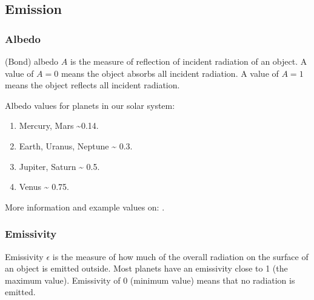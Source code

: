 \documentclass[letterpaper,10pt,english]{sphinxmanual}
\begin{document}
\subsection{Emission}
\label{\detokenize{quantities/surface/emission/emission:emission}}\label{\detokenize{quantities/surface/emission/emission::doc}}\label{\detokenize{quantities/surface/emission/emission:id1}}

\subsubsection{Albedo}
\label{\detokenize{quantities/surface/emission/albedo:albedo}}\label{\detokenize{quantities/surface/emission/albedo::doc}}\label{\detokenize{quantities/surface/emission/albedo:id1}}
\sphinxAtStartPar
(Bond) albedo \(A\) is the measure of reflection of incident radiation of an object.
A value of \(A = 0\) means the object absorbs all incident radiation.
A value of \(A = 1\) means the object reflects all incident radiation.

\sphinxAtStartPar
Albedo values for planets in our solar system:
\begin{enumerate}
%
\item {} 
\sphinxAtStartPar
Mercury, Mars \textasciitilde{}0.14.

\item {} 
\sphinxAtStartPar
Earth, Uranus, Neptune \textasciitilde{} 0.3.

\item {} 
\sphinxAtStartPar
Jupiter, Saturn \textasciitilde{} 0.5.

\item {} 
\sphinxAtStartPar
Venus \textasciitilde{} 0.75.

\end{enumerate}

\sphinxAtStartPar
More information and example values on: .


\subsubsection{Emissivity}
\label{\detokenize{quantities/surface/emission/emissivity:emissivity}}\label{\detokenize{quantities/surface/emission/emissivity::doc}}\label{\detokenize{quantities/surface/emission/emissivity:id1}}
\sphinxAtStartPar
Emissivity \(\epsilon\) is the measure of how much of the overall radiation on the surface of an object
is emitted outside. Most planets have an emissivity close to 1 (the maximum value).
Emissivity of 0 (minimum value) means that no radiation is emitted.
\end{document}
